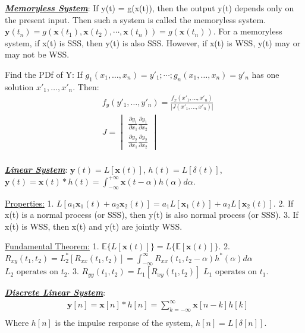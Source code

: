 \documentclass[12pt]{article}
\newcommand{\bulletPoint}[1]{\ul{\textit{\textbf{#1}}}}
\begin{document}
\begin{multicols*}{4}
\bulletPoint{Memoryless System}: If y(t) = g(x(t)), then the output y(t) depends only on the present input. Then such a system is called the memoryless system. $\mathbf{y}(t_n) = g(\mathbf{x}(t_1), \mathbf{x}(t_2), \cdots, \mathbf{x}(t_n)) = g(\mathbf{x}(t_n))$. For a memoryless system, if x(t) is SSS, then y(t) is also SSS. However, if x(t) is WSS, y(t) may or may not be WSS.

Find the PDf of Y: If $g_1(x_1, \ldots, x_n ) = y'_1; \cdots; g_n(x_1, \ldots, x_n ) = y'_n$ has one solution $x'_1, \ldots, x'_n$. Then:
\useshortskip \begin{equation*}
    \begin{split}
        & f_y(y'_1, \ldots,y'_n) = \frac{f_x(x'_1, \ldots, x'_n)}{|J(x'_1, \ldots, x'_n)|} \\[-8pt]
        & J = 
            \begin{vmatrix}
            \frac{\partial y_1}{\partial x_1} \frac{\partial y_1}{\partial x_2} \\
            \frac{\partial y_2}{\partial x_1} \frac{\partial y_2}{\partial x_2}
            \end{vmatrix}\\
    \end{split}
\end{equation*}


\bulletPoint{Linear System}: $\mathbf{y}(t) = L[\mathbf{x}(t)]$, $h(t) = L[\delta(t)]$, $ \mathbf{y}(t) = \mathbf{x}(t) * h(t) = \int^{+\infty}_{-\infty}\mathbf{x}(t-\alpha) h(\alpha) d\alpha$. 

\underline{Properties:} 1. $L[a_1\mathbf{x}_1(t) + a_2\mathbf{x}_2(t)] = a_1L[\mathbf{x}_1(t)] + a_2L[\mathbf{x}_2(t)]$. 2. If x(t) is a normal process (or SSS), then y(t) is also normal process (or SSS). 3. If x(t) is WSS, then x(t) and y(t) are jointly WSS.

\underline{Fundamental Theorem:} 1. $\mathbb{E}\{L[\mathbf{x}(t)]\} = L\{\mathbb{E}[\mathbf{x}(t)]\}$. 2. $R_{xy}(t_1,t_2) = L^*_2[R_{xx}(t_1,t_2)] = \int^\infty_{-\infty}R_{xx}(t_1,t_2-\alpha)h^*(\alpha)d\alpha$ $L_2 \text{ operates on } t_2$. 3. $R_{yy}(t_1,t_2)=L_1[R_{xy}(t_1,t_2)]$ $L_1\text{ operates on }t_1$.


\bulletPoint{Discrete Linear System}:
\useshortskip \begin{equation*}
    \begin{split}
        & \mathbf{y}[n] = \mathbf{x}[n] * h[n] = \sum^{\infty}_{k=-\infty}\mathbf{x}[n-k]h[k] \\[-8pt]
    \end{split}
\end{equation*}
Where $h[n]$ is the impulse response of the system, $h[n] = L[\delta[n]]$.



\end{multicols*}
\end{document}
